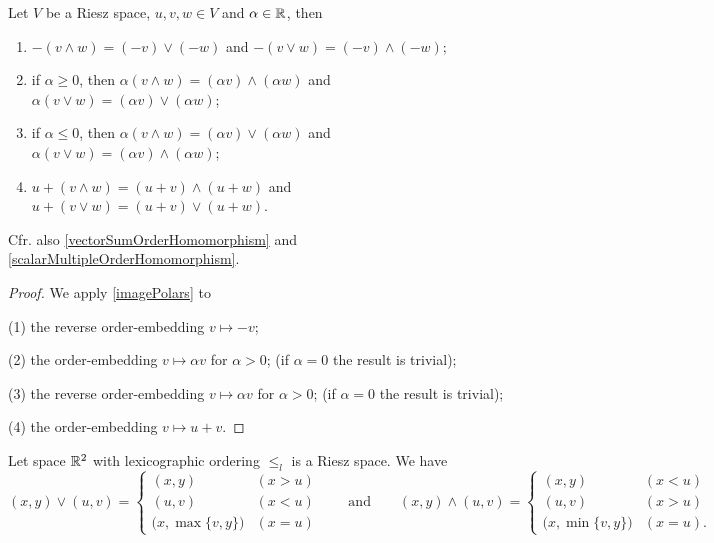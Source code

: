 \begin{lemma} \label{lemmaRieszSpaces}
Let $V$ be a Riesz space, $u,v,w\in V$ and $\alpha\in \mathbb{R}$, then
\begin{enumerate}
\item $-(v \wedge w) = (-v)\vee (-w)$ and $-(v \vee w) = (-v)\wedge (-w)$;
\item if $\alpha \geq 0$, then $\alpha(v \wedge w) = (\alpha v)\wedge (\alpha w)$ and $\alpha(v \vee w) = (\alpha v)\vee (\alpha w)$;
\item if $\alpha \leq 0$, then $\alpha(v \wedge w) = (\alpha v)\vee (\alpha w)$ and $\alpha(v \vee w) = (\alpha v)\wedge (\alpha w)$;
\item $u+(v \wedge w) = (u+v)\wedge (u+w)$ and $u+(v \vee w) = (u+v)\vee (u+w)$.
\end{enumerate}
\end{lemma}
Cfr. also \ref{vectorSumOrderHomomorphism} and \ref{scalarMultipleOrderHomomorphism}.
\begin{proof}
We apply \ref{imagePolars} to

(1) the reverse order-embedding $v\mapsto -v$;

(2) the order-embedding $v\mapsto \alpha v$ for $\alpha > 0$; (if $\alpha = 0$ the result is trivial);

(3) the reverse order-embedding $v\mapsto \alpha v$ for $\alpha > 0$; (if $\alpha = 0$ the result is trivial);

(4) the order-embedding $v\mapsto u+v$.
\end{proof}

\begin{example}
Let space $\mathbb{R}^2$ with lexicographic ordering $\leq_l$ is a Riesz space. We have
\[ (x,y)\vee (u,v) = \begin{cases}
(x,y) & (x>u) \\ (u,v) & (x<u) \\ \big(x, \max\{v,y\}\big) & (x = u)
\end{cases} \qquad\text{and}\qquad (x,y)\wedge (u,v) = \begin{cases}
(x,y) & (x<u) \\ (u,v) & (x>u) \\ \big(x, \min\{v,y\}\big) & (x = u).
\end{cases} \]
\end{example}

